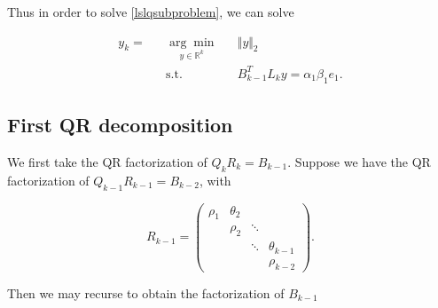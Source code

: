 \documentclass[11pt]{article}
\begin{document}
Thus in order to solve \ref{lslqsubproblem}, we can solve

\begin{equation}
\label{lslqsubproblemy}
\begin{aligned}
y_k =&& \underset{y \in \mathbb{R}^k}{\arg\min} && \Vert y \Vert_2 \\
&& \text{s.t.} && B_{k-1}^T L_k y = \alpha_1 \beta_1 e_1.
\end{aligned}
\end{equation}

\subsection{First QR decomposition}
We first take the QR factorization of $Q_k R_k = B_{k-1}$. Suppose we have the QR factorization of $Q_{k-1}R_{k-1} = B_{k-2}$, with

\begin{equation*}
R_{k-1} = \begin{pmatrix}
\rho_1 & \theta_2 & & \\
& \rho_2 & \ddots & \\
& & \ddots & \theta_{k-1} \\
& & & \rho_{k-2}
\end{pmatrix}.
\end{equation*}

Then we may recurse to obtain the factorization of $B_{k-1}$
\end{document}
